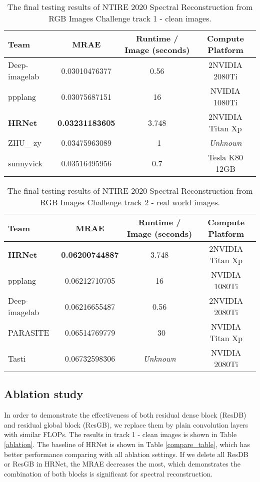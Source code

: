 \documentclass[10pt,twocolumn,letterpaper]{article}
\begin{document}
\begin{table*}[t]
\begin{center}
\begin{tabular}{lccc}
\hline
Team & MRAE & Runtime / Image (seconds) & Compute Platform \\
\hline
\hline
Deep-imagelab & 0.03010476377 & 0.56 & 2NVIDIA 2080Ti \\
\hline
ppplang & 0.03075687151 & 16 & NVIDIA 1080Ti \\
\hline
\textbf{HRNet} & \textbf{0.03231183605} & 3.748 & 2NVIDIA Titan Xp \\
\hline
ZHU\_ zy & 0.03475963089 & ~1 & \emph{Unknown} \\
\hline
sunnyvick & 0.03516495956 & 0.7 & Tesla K80 12GB \\
\hline
\end{tabular}
\end{center}
\caption{The final testing results of NTIRE 2020 Spectral Reconstruction from RGB Images Challenge track 1 - clean images.}
\label{track1}
\end{table*}

\begin{table*}[t]
\begin{center}
\begin{tabular}{lccc}
\hline
Team & MRAE & Runtime / Image (seconds) & Compute Platform \\
\hline
\hline
\textbf{HRNet} & \textbf{0.06200744887} & 3.748 & 2NVIDIA Titan Xp \\
\hline
ppplang & 0.06212710705 & 16 & NVIDIA 1080Ti \\
\hline
Deep-imagelab & 0.06216655487 & 0.56 & 2NVIDIA 2080Ti \\
\hline
PARASITE & 0.06514769779 & ~30 & NVIDIA Titan Xp \\
\hline
Tasti & 0.06732598306 & \emph{Unknown} & NVIDIA 2080Ti \\
\hline
\end{tabular}
\end{center}
\caption{The final testing results of NTIRE 2020 Spectral Reconstruction from RGB Images Challenge track 2 - real world images.}
\label{track2}
\end{table*}

\subsection{Ablation study}

In order to demonstrate the effectiveness of both residual dense block (ResDB) and residual global block (ResGB), we replace them by plain convolution layers with similar FLOPs. The results in track 1 - clean images is shown in Table \ref{ablation}. The baseline of HRNet is shown in Table \ref{compare_table}, which has better performance comparing with all ablation settings. If we delete all ResDB or ResGB in HRNet, the MRAE decreases the most, which demonstrates the combination of both blocks is significant for spectral reconstruction.
\end{document}
